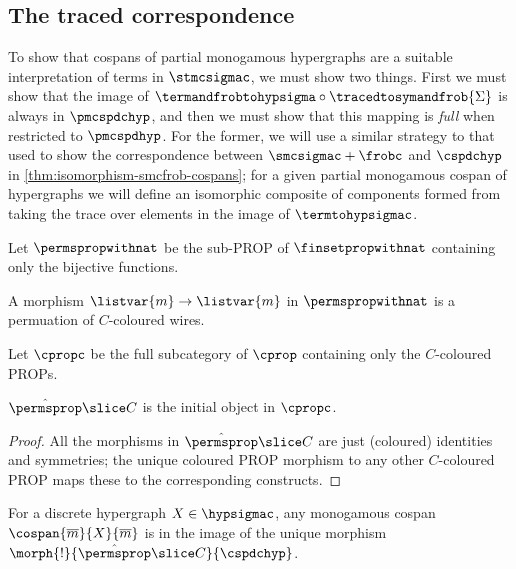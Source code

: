 \subsection{The traced correspondence}

To show that cospans of partial monogamous hypergraphs are a suitable
interpretation of terms in \(\stmcsigmac\), we must show two things.
First we must show that the image of
\(\termandfrobtohypsigma \circ \tracedtosymandfrob{\Sigma}\) is always in
\(\pmcspdchyp\), and then we must show that this mapping is \emph{full} when
restricted to \(\pmcspdhyp\).
For the former, we will use a similar strategy to that used to show the
correspondence between \(\smcsigmac + \frobc\) and \(\cspdchyp\) in
\cref{thm:isomorphism-smcfrob-cospans}; for a given partial monogamous cospan of
hypergraphs we will define an isomorphic composite of components formed from
taking the trace over elements in the image of \(\termtohypsigmac\).

\begin{definition}
    Let \(\permspropwithnat\) be the sub-PROP of \(\finsetpropwithnat\)
    containing only the bijective functions.
\end{definition}

A morphism \(\listvar{m} \to \listvar{m}\) in \(\permspropwithnat\) is a
permuation of \(C\)-coloured wires.


\begin{definition}
    Let \(\cpropc\) be the full subcategory of \(\cprop\) containing only the
    \(C\)-coloured PROPs.
\end{definition}

\begin{lemma}
    \(\hat{\permsprop} \slice C\) is the initial object in \(\cpropc\).
\end{lemma}
\begin{proof}
    All the morphisms in \(\hat{\permsprop} \slice C\) are just (coloured)
    identities and symmetries; the unique coloured PROP morphism to any other
    \(C\)-coloured PROP maps these to the corresponding constructs.
\end{proof}

\begin{corollary}
    For a discrete hypergraph \(X \in \hypsigmac\), any monogamous cospan
    \(\cospan{\overline{m}}{X}{\overline{m}}\) is in the image of the unique
    morphism \(\morph{!}{\hat{\permsprop} \slice C}{\cspdchyp}\).
\end{corollary}

